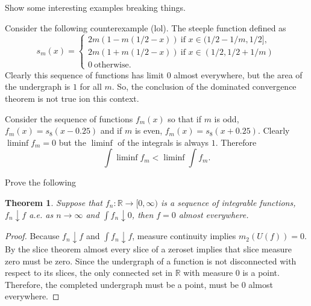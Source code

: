 \documentclass[letter]{article}
\newtheorem{theorem}{Theorem}
\newenvironment{menumerate}{%
  \edef\backupindent{\the\parindent}%
  \enumerate%
  \setlength{\parindent}{\backupindent}%
}{\endenumerate}
\begin{document}
\begin{menumerate}
     \setcounter{enumi}{32}
     \item Show some interesting examples breaking things.
     \begin{menumerate}
        \item Consider the following counterexample (lol). The steeple function defined as
        \begin{equation}
            s_m(x) = \left\{ \begin{array}{l}
                 2m(1 - m(1/2 - x))\  \text{if $x \in (1/2 - 1/m, 1/2],$} \\
                 2m(1 + m(1/2 - x))\  \text{if $x \in (1/2, 1/2 + 1/m)$} \\
                 0\ \text{otherwise.}
            \end{array} \right.       
        \end{equation}
        Clearly this sequence of functions has limit $0$ almost everywhere, but the area of the undergraph is $1$ for all $m$.
        So, the conclusion of the dominated convergence theorem is not true ion this context.
        \item Consider the sequence of functions $f_m(x)$ so that 
        if $m$ is odd, $f_m(x) = s_8(x-0.25)$ and if $m$ is even,
        $f_m(x) = s_8(x + 0.25).$ Clearly $\liminf f_m = 0$
        but the $\liminf$ of the integrals is always $1$.
        Therefore
        \begin{equation}
            \int \liminf f_m < \liminf \int f_m.
         \end{equation} 
     \end{menumerate}
     \item Prove the following
     \begin{theorem}
         Suppose that $f_n : \mathbb{R} \to [0, \infty)$ is a
         sequence of integrable functions, $f_n \downarrow f$ a.e. as $n \to \infty$ and $\int f_n \downarrow 0$, then $f = 0$ almost everywhere.
     \end{theorem}
     \begin{proof}
        Because $f_n \downarrow f$ and $\int f_n \downarrow f$, measure continuity implies $m_2(U(f)) = 0.$ By the slice theorem almost
        every slice of a zeroset implies that slice measure zero must be zero. Since the undergraph of a function is not disconnected with respect to its slices, the only connected set in $\mathbb{R}$ with measure $0$ is a point. Therefore, the completed undergraph must be a point, must be $0$ almost everywhere.
     \end{proof}

\end{menumerate}
\end{document}
